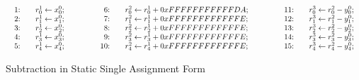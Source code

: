 \begin{figure*}
  \centering
  $
  \begin{array}{lclcl}
    \begin{array}{rcl}
    \textmd{1:} && {r}^1_0 \leftarrow {x}^0_0; \\
    \textmd{2:} && {r}^1_1 \leftarrow {x}^0_1; \\
    \textmd{3:} && {r}^1_2 \leftarrow {x}^0_2; \\
    \textmd{4:} && {r}^1_3 \leftarrow {x}^0_3; \\
    \textmd{5:} && {r}^1_4 \leftarrow {x}^0_4; \\
    \end{array}
    &\hspace{.05\textwidth}&
    \begin{array}{rcl}
    \textmd{6:} &&
      {r}^2_0 \leftarrow {r}^1_0 + {0xFFFFFFFFFFFDA}; \\
    \textmd{7:} &&
      {r}^2_1 \leftarrow {r}^1_1 + {0xFFFFFFFFFFFFE}; \\
    \textmd{8:} &&
      {r}^2_2 \leftarrow {r}^1_2 + {0xFFFFFFFFFFFFE}; \\
    \textmd{9:} &&
      {r}^2_3 \leftarrow {r}^1_3 + {0xFFFFFFFFFFFFE}; \\
    \textmd{10:} &&
      {r}^2_4 \leftarrow {r}^1_4 + {0xFFFFFFFFFFFFE};\\
    \end{array}
    &\hspace{.05\textwidth}&
    \begin{array}{rcl}
    \textmd{11:} && {r}^3_0 \leftarrow {r}^2_0 - {y}^0_0; \\
    \textmd{12:} && {r}^3_1 \leftarrow {r}^2_1 - {y}^0_1; \\
    \textmd{13:} && {r}^3_2 \leftarrow {r}^2_2 - {y}^0_2; \\
    \textmd{14:} && {r}^3_3 \leftarrow {r}^2_3 - {y}^0_3; \\
    \textmd{15:} && {r}^3_4 \leftarrow {r}^2_4 - {y}^0_4;
    \end{array}
  \end{array}
  $
  \caption{Subtraction  in Static Single Assignment Form}
  \label{figure:translation:subtraction-ssa}
\end{figure*}

